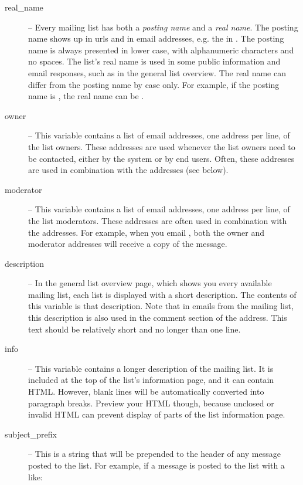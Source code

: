 \documentclass{howto}
\begin{document}
\begin{description}
\item[real_name] --
    Every mailing list has both a \emph{posting name} and a \emph{real
    name}.  The posting name shows up in urls and in email addresses,
    e.g. the  in .  The posting
    name is always presented in lower case, with alphanumeric
    characters and no spaces.  The list's real name is used in some
    public information and email responses, such as in the general
    list overview.  The real name can differ from the posting name by
    case only.  For example, if the posting name is , the
    real name can be .

\item[owner] --
    This variable contains a list of email addresses, one address per
    line, of the list owners.  These addresses are used whenever the
    list owners need to be contacted, either by the system or by end
    users.  Often, these addresses are used in combination with the
     addresses (see below).

\item[moderator] --
    This variable contains a list of email addresses, one address per
    line, of the list moderators.  These addresses are often used in
    combination with the  addresses.  For example, when
    you email , both the owner and
    moderator addresses will receive a copy of the message.

\item[description] --
    In the general list overview page, which shows you every available
    mailing list, each list is displayed with a short description.
    The contents of this variable is that description.  Note that in
    emails from the mailing list, this description is also used in the
    comment section of the  address.  This text should
    be relatively short and no longer than one line.

\item[info] --
    This variable contains a longer description of the mailing list.
    It is included at the top of the list's information page, and it
    can contain HTML.  However, blank lines will be automatically
    converted into paragraph breaks.  Preview your HTML though,
    because unclosed or invalid HTML can prevent display of parts of
    the list information page.

\item[subject_prefix] --
    This is a string that will be prepended to the
     header of any message posted to the list.
    For example, if a message is posted to the list with a
     like:


\end{description}
\end{document}
